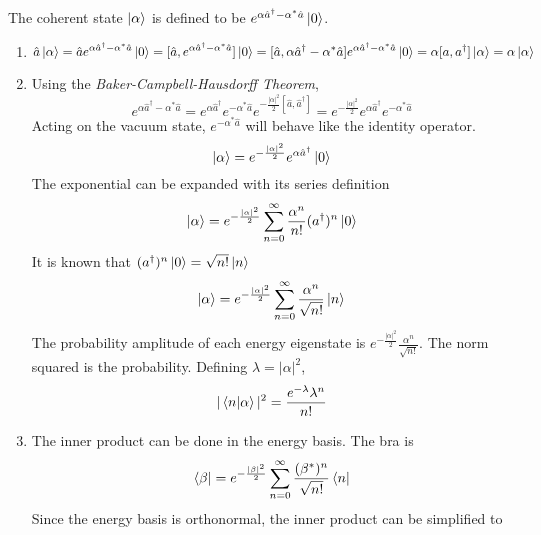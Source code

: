 \begin{sol}
The coherent state $\ket\alpha$ is defined to be $e^{\alpha\hat a^\dagger-\alpha^*\hat a}\ket0$.
\begin{enumerate}[label=\textbf{(\alph*)}]
\item
\begin{equation}
	\hat a\ket\alpha=\hat ae^{\alpha\hat a^\dagger-\alpha^*\hat a}\ket0=[\hat a, e^{\alpha\hat a^\dagger-\alpha^*\hat a}]\ket 0=[\hat a, \alpha\hat a^\dagger-\alpha^*\hat a]e^{\alpha\hat a^\dagger-\alpha^*\hat a}\ket0=\alpha[a,a^\dagger]\ket\alpha=\alpha\ket\alpha
\end{equation} 
\item
Using the \textit{Baker-Campbell-Hausdorff Theorem},
\begin{equation}
	e^{\alpha\hat a^\dagger-\alpha^*\hat a}=e^{\alpha\hat a^\dagger}e^{-\alpha^*\hat a}e^{-\frac{|\alpha|^2}{2}[\hat a, \hat a^\dagger]}=e^{-\frac{|\alpha|^2}{2}}e^{\alpha\hat a^\dagger}e^{-\alpha^*\hat a}
\end{equation}
Acting on the vacuum state, $e^{-\alpha^*\hat a}$ will behave like the identity operator. 
\begin{equation}
	\ket\alpha=e^{-\frac{|\alpha|^2}{2}}e^{\alpha\hat a^\dagger}\ket0
\end{equation}
The exponential can be expanded with its series definition
\begin{equation}
	\ket\alpha=e^{-\frac{|\alpha|^2}{2}}\sum_{n=0}^\infty \frac{\alpha^n }{n!}(a^\dagger)^n\ket 0
\end{equation} 
It is known that $(a^\dagger)^n\ket 0=\sqrt{n!}\ket n$ 
\begin{equation}
	\ket\alpha=e^{-\frac{|\alpha|^2}{2}}\sum_{n=0}^\infty \frac{\alpha^n }{\sqrt{n!}}\ket n
\end{equation} 
The probability amplitude of each energy eigenstate is $e^{-\frac{|\alpha|^2}{2}}\frac{\alpha^n }{\sqrt{n!}}$. The norm squared is the probability. Defining $\lambda=|\alpha|^2$,
\begin{equation}
	|\braket{n}{\alpha}|^2=\frac{e^{-\lambda}\lambda^n}{n!}
\end{equation}
\item
The inner product can be done in the energy basis. The bra is
\begin{equation}
	\bra\beta=e^{-\frac{|\beta|^2}{2}}\sum_{n=0}^\infty\frac{(\beta^*)^n}{\sqrt{n!}}\bra n
\end{equation}  
Since the energy basis is orthonormal, the inner product can be simplified to
\begin{equation}

\end{equation}
\end{enumerate}
\end{sol}
